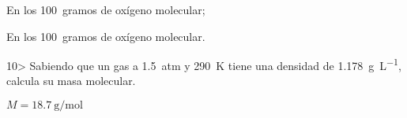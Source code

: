 \documentclass[twocolumn]{article}
\begin{document}
\begin{solution}
  \begin{enumerate*}
    \item En los \SI{100}{gramos} de oxígeno molecular;
    \item En los \SI{100}{gramos} de oxígeno molecular.
  \end{enumerate*}
\end{solution}

\begin{exercise}
  10> Sabiendo que un gas a \SI{1,5}{atm} y \SI{290}{\kelvin} tiene una densidad de \SI{1,178}{\gram\per\liter}, calcula su masa molecular.
\end{exercise}
\begin{solution}
  $M = \SI{18,7}{\gram\per\mole}$
\end{solution}
\end{document}
